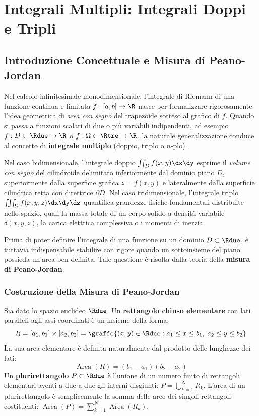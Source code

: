 
\chapter{Integrali Multipli: Integrali Doppi e Tripli}
\label{chap:integrali_multipli}

\section{Introduzione Concettuale e Misura di Peano-Jordan}

Nel calcolo infinitesimale monodimensionale, l'integrale di Riemann di una funzione continua e limitata $f: [a,b] \to \R$ nasce per formalizzare rigorosamente l'idea geometrica di \textit{area con segno} del trapezoide sotteso al grafico di $f$. Quando si passa a funzioni scalari di due o più variabili indipendenti, ad esempio $f: D \subset \Rdue \to \R$ o $f: \Omega \subset \Rtre \to \R$, la naturale generalizzazione conduce al concetto di \textbf{integrale multiplo} (doppio, triplo o $n$-plo).

Nel caso bidimensionale, l'integrale doppio $\iint_D f(x,y) \dx\dy$ esprime il \textit{volume con segno} del cilindroide delimitato inferiormente dal dominio piano $D$, superiormente dalla superficie grafica $z = f(x,y)$ e lateralmente dalla superficie cilindrica retta con direttrice $\partial D$. Nel caso tridimensionale, l'integrale triplo $\iiint_\Omega f(x,y,z) \dx\dy\dz$ quantifica grandezze fisiche fondamentali distribuite nello spazio, quali la massa totale di un corpo solido a densità variabile $\delta(x,y,z)$, la carica elettrica complessiva o i momenti di inerzia.

Prima di poter definire l'integrale di una funzione su un dominio $D \subset \Rdue$, è tuttavia indispensabile stabilire con rigore quando un sottoinsieme del piano possieda un'area ben definita. Tale questione è risolta dalla teoria della \textbf{misura di Peano-Jordan}.

\subsection{Costruzione della Misura di Peano-Jordan}

Sia dato lo spazio euclideo $\Rdue$. Un \textbf{rettangolo chiuso elementare} con lati paralleli agli assi coordinati è un insieme della forma:
\[
R = [a_1, b_1] \times [a_2, b_2] = \graffe{(x,y) \in \Rdue : a_1 \le x \le b_1, \; a_2 \le y \le b_2}
\]
La sua area elementare è definita naturalmente dal prodotto delle lunghezze dei lati:
\[
\operatorname{Area}(R) = (b_1 - a_1)(b_2 - a_2)
\]
Un \textbf{plurirettangolo} $P \subset \Rdue$ è l'unione di un numero finito di rettangoli elementari aventi a due a due gli interni disgiunti: $P = \bigcup_{k=1}^N R_k$. L'area di un plurirettangolo è semplicemente la somma delle aree dei singoli rettangoli costituenti: $\operatorname{Area}(P) = \sum_{k=1}^N \operatorname{Area}(R_k)$.

